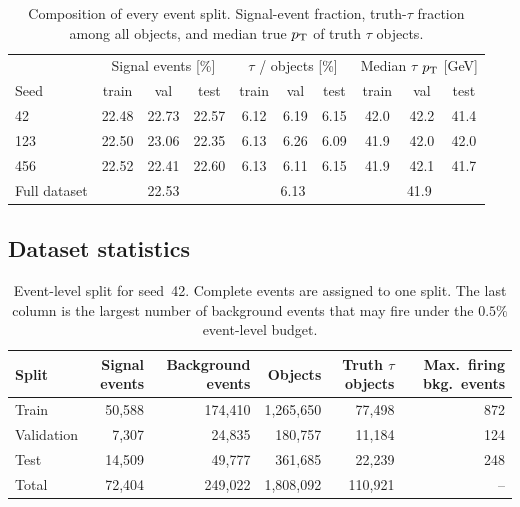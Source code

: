 \begin{table}[h]
  \centering
  \caption{Composition of every event split. Signal-event fraction, truth-$\tau$ fraction among all objects, and median true $p_{\mathrm{T}}$ of truth $\tau$ objects.}
  \label{tab:seed_splits}
  \small
  \begin{tabular}{@{}lccc@{\qquad}ccc@{\qquad}ccc@{}}
    \toprule
    & \multicolumn{3}{c}{Signal events [\%]} & \multicolumn{3}{c}{$\tau$ / objects [\%]} & \multicolumn{3}{c}{Median $\tau$ $p_{\mathrm{T}}$ [GeV]} \\
    Seed & train & val & test & train & val & test & train & val & test \\
    \midrule
    42  & 22.48 & 22.73 & 22.57 & 6.12 & 6.19 & 6.15 & 42.0 & 42.2 & 41.4 \\
    123 & 22.50 & 23.06 & 22.35 & 6.13 & 6.26 & 6.09 & 41.9 & 42.0 & 42.0 \\
    456 & 22.52 & 22.41 & 22.60 & 6.13 & 6.11 & 6.15 & 41.9 & 42.1 & 41.7 \\
    \midrule
    Full dataset & \multicolumn{3}{c}{22.53} & \multicolumn{3}{c}{6.13} & \multicolumn{3}{c}{41.9} \\
    \bottomrule
  \end{tabular}
\end{table}

\subsection{Dataset statistics}
\begin{table}[h]
  \centering
  \caption{Event-level split for seed~42. Complete events are assigned to one split. The last column is the largest number of background events that may fire under the $0.5\%$ event-level budget.}
  \label{tab:data_stats}
  \small
  \begin{tabular}{@{}lrrrrr@{}}
    \toprule
    Split & Signal events & Background events & Objects & Truth $\tau$ objects & Max.\ firing bkg.\ events \\
    \midrule
    Train      & 50{,}588 & 174{,}410 & 1{,}265{,}650 & 77{,}498 & 872 \\
    Validation &  7{,}307 &  24{,}835 &   180{,}757   & 11{,}184 & 124 \\
    Test       & 14{,}509 &  49{,}777 &   361{,}685   & 22{,}239 & 248 \\
    \midrule
    Total      & 72{,}404 & 249{,}022 & 1{,}808{,}092 & 110{,}921 & -- \\
    \bottomrule
  \end{tabular}
\end{table}

